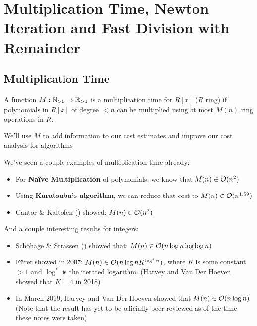 
\section{Multiplication Time, Newton Iteration and Fast Division with Remainder}

\subsection{Multiplication Time}
\begin{definition}{}{}
    A function $M:\operatorname{\mathbb{N}}_{> 0} \rightarrow \operatorname{\mathbb{R}}_{>0}$ is a \ul{multiplication time} for $R[x]$ ($R$ ring) if polynomials in $R[x]$ of degree $< n$ can be multiplied using at most $M(n)$ ring operations in $R$.
\end{definition}
We'll use $M$ to add information to our cost estimates and improve our cost analysis for algorithms

\begin{example}{}{}
    We've seen a couple examples of multiplication time already:
    \begin{itemize}
        \item For \textbf{Na\"{i}ve Multiplication} of polynomials, we know that $M(n) \in \operatorname{\mathcal{O}}(n^2)$
        \item Using \textbf{Karatsuba's algorithm}, we can reduce that cost to $M(n) \in \operatorname{\mathcal{O}}(n^{1.59})$
        \item Cantor \& Kaltofen () showed: $M(n) \in \operatorname{\mathcal{O}}(n^2)$
    \end{itemize}
    And a couple interesting results for integers:
    \begin{itemize}
        \item Sch\"{o}hage \& Strassen () showed that: $M(n) \in \operatorname{\mathcal{O}}(n\log n\log \log n)$
        \item F\"{u}rer showed in 2007: $M(n) \in \operatorname{\mathcal{O}}(n\log n K^{\log^* n})$, where $K$ is some constant $> 1$ and $\log^*$ is the iterated logarithm. (Harvey and Van Der Hoeven showed that $K = 4$ in 2018)
        \item In March 2019, Harvey and Van Der Hoeven showed that $M(n) \in \operatorname{\mathcal{O}}(n \log n)$ (Note that the result has yet to be officially peer-reviewed as of the time these notes were taken)
    \end{itemize}
\end{example}

